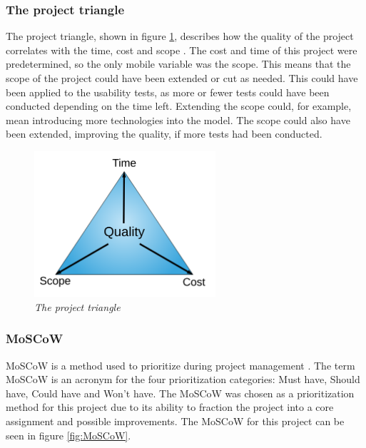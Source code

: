 \subsubsection{The project triangle}

The project triangle, shown in figure \ref{fig:project_triangle}, describes how the quality of the project correlates with the time, cost and scope  \cite{TheProjectTriangle}. The cost and time of this project were predetermined, so the only mobile variable was the scope. This means that the scope of the project could have been extended or cut as needed. This could have been applied to the usability tests, as more or fewer tests could have been conducted depending on the time left. Extending the scope could, for example, mean introducing more technologies into the model. The scope could also have been extended, improving the quality, if more tests had been conducted.

\begin{figure}[ht]
    \centering 
    \includegraphics[width=0.6\textwidth]{img/project_triangle.png}
    \hfill
    \caption{\textit{The project triangle}}
    \label{fig:project_triangle}
\end{figure}

\subsubsection{MoSCoW}

MoSCoW is a method used to prioritize during project management \cite{MoSCoWforUX}. The term MoSCoW is an acronym for the four prioritization categories: Must have, Should have, Could have and Won’t have. The MoSCoW was chosen as a prioritization method for this project due to its ability to fraction the project into a core assignment and possible improvements. 
The MoSCoW for this project can be seen in figure  \ref{fig:MoSCoW}.

